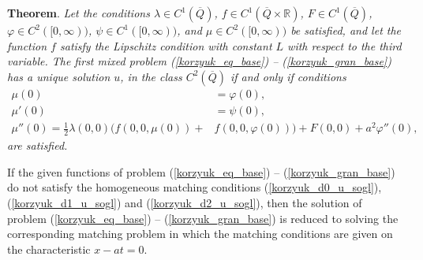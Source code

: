 \documentclass[12pt]{llncs}
\begin{document}
{\bf Theorem}. {\it Let the conditions $\lambda \in C^1(\overline{Q})$, $f \in C^1(\overline{Q} \times \mathbb{R})$, $F \in C^1(\overline{Q})$, $\varphi \in C^2([0,\infty))$, $\psi \in C^1([0,\infty))$, and $\mu \in C^2([0,\infty))$ be satisfied, and let the function $f$ satisfy the Lipschitz condition
with constant $L$ with respect to the third variable. The first mixed problem (\ref{korzyuk_eq_base}) -- (\ref{korzyuk_gran_base}) has a unique
solution $u$, in the class $C^2(\overline{Q})$ if and only if conditions \begin{align}
\mu(0) &= \varphi(0), \label{korzyuk_d0_u_sogl} \\
\mu'(0) &= \psi(0), \label{korzyuk_d1_u_sogl} \\
\mu ''(0) = \frac{1}{2} \lambda (0,0) (f(0,0,\mu (0))+&f(0,0,\varphi (0)))+F(0,0)+a^2 \varphi ''(0), \label{korzyuk_d2_u_sogl}
\end{align}
are satisfied. }

If the given functions of problem (\ref{korzyuk_eq_base}) -- (\ref{korzyuk_gran_base}) do not satisfy the homogeneous matching conditions (\ref{korzyuk_d0_u_sogl}), (\ref{korzyuk_d1_u_sogl}) and (\ref{korzyuk_d2_u_sogl}), then the solution of problem (\ref{korzyuk_eq_base}) -- (\ref{korzyuk_gran_base}) is reduced to solving the corresponding matching problem in which the matching conditions are given on the characteristic $x - a t = 0$.
\end{document}
